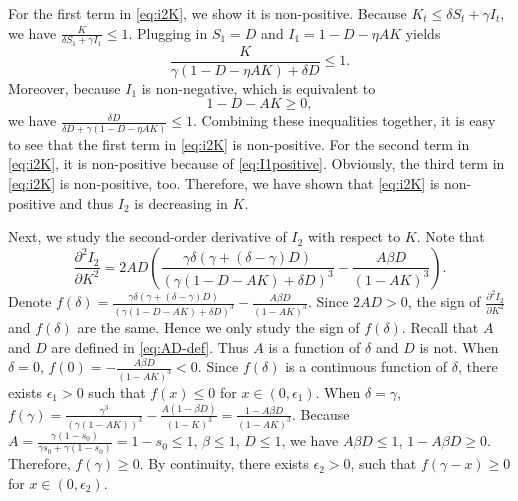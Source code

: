 \documentclass[nonblindrev, copyedit]{informs3a}
\begin{document}
For the first term in \eqref{eq:i2K}, we show it is non-positive.
Because $K_t\le \delta S_t+\gamma I_t$, we have $\frac{K}{\delta S_1+\gamma I_1}\le1$.
Plugging in $S_1=D$ and $I_1=1-D-\eta AK$ yields
\begin{equation} \label{eq:fraction less than one}
\frac{K}{\gamma(1-D-\eta AK)+\delta D}\le 1.
\end{equation}
Moreover, because $I_1$ is non-negative, which is equivalent to
\begin{equation} \label{eq:I1positive}
1-D-AK\ge0,
\end{equation}
we have $\frac{\delta D}{\delta D+\gamma(1-D-\eta AK)}\le 1$.
Combining these inequalities together, it is easy to see that the first term in \eqref{eq:i2K} is non-positive.
For the second term in \eqref{eq:i2K}, it is non-positive because of \eqref{eq:I1positive}. Obviously, the third term in \eqref{eq:i2K} is non-positive, too.
Therefore, we have shown that \eqref{eq:i2K} is non-positive and thus $I_2$ is decreasing in $K$.



Next, we study the second-order derivative of $I_2$ with respect to $K$.
Note that
\begin{equation*}
\frac{\partial^2 I_2}{\partial K^2}=2AD\left(\frac{\gamma\delta(\gamma+(\delta-\gamma)D)}{(\gamma(1-D-AK)+\delta D)^3}-\frac{A\beta D}{(1-AK)^3}\right).
\end{equation*}
Denote $f(\delta)=\frac{\gamma\delta(\gamma+(\delta-\gamma)D)}{(\gamma(1-D-AK)+\delta D)^3}-\frac{A\beta D}{(1-AK)^3}.$ Since $2AD>0$, the sign of $\frac{\partial^2 I_2}{\partial K^2}$ and $f(\delta)$ are the same. Hence we only study the sign of $f(\delta)$. Recall that $A$ and $D$ are defined in \eqref{eq:AD-def}. Thus $A$ is a function of $\delta$ and $D$ is not.
When $\delta=0$, $f(0)=-\frac{A\beta D}{(1-AK)^3}<0$.
Since $f(\delta)$ is a continuous function of $\delta$, there exists $\epsilon_1>0$ such that $f(x)\le 0$ for $x\in(0,\epsilon_1)$.
When $\delta=\gamma$, $f(\gamma)=\frac{\gamma^3}{(\gamma(1-AK))^3}-\frac{A(1-\beta D)}{(1-K)^3}=\frac{1-A\beta D}{(1-AK)^3}$.
Because $A=\frac{\gamma(1-s_0)}{\gamma s_0+\gamma(1-s_0)}=1-s_0\le1$, $\beta\le1$, $D\le1$, we have $A\beta D\le1$, $1-A\beta D\ge0$.
Therefore, $f(\gamma)\ge0$.
By continuity, there exists $\epsilon_2>0$, such that $f(\gamma-x)\ge0$ for $x\in(0,\epsilon_2)$.
\end{document}
